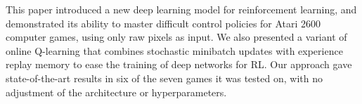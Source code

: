 This paper introduced a new deep learning model for reinforcement learning, and demonstrated its ability to master difficult control policies for Atari 2600 computer games, using only raw pixels as input.
We also presented a variant of online Q-learning that combines stochastic minibatch updates with experience replay memory to ease the training of deep networks for RL.
Our approach gave state-of-the-art results in six of the seven games it was tested on, with no adjustment of the architecture or hyperparameters.

% 
% 
% 
% 
